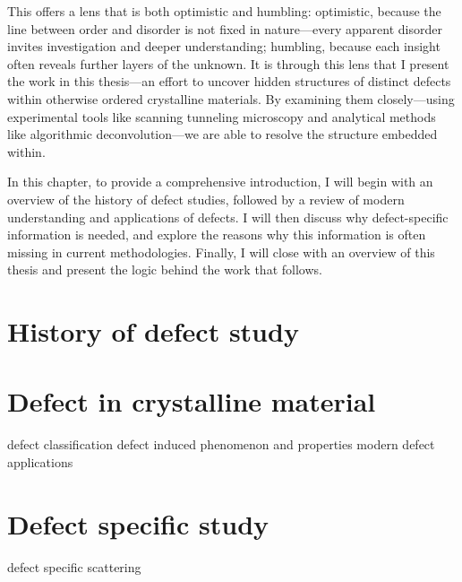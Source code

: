 This offers a lens that is both optimistic and humbling: optimistic, because the line between order and disorder is not fixed in nature—every apparent disorder invites investigation and deeper understanding; humbling, because each insight often reveals further layers of the unknown. It is through this lens that I present the work in this thesis—an effort to uncover hidden structures of distinct defects within otherwise ordered crystalline materials. By examining them closely—using experimental tools like scanning tunneling microscopy and analytical methods like algorithmic deconvolution—we are able to resolve the structure embedded within.

In this chapter, to provide a comprehensive introduction, I will begin with an overview of the history of defect studies, followed by a review of modern understanding and applications of defects. I will then discuss why defect-specific information is needed, and explore the reasons why this information is often missing in current methodologies. Finally, I will close with an overview of this thesis and present the logic behind the work that follows.

\section{History of defect study}
	










\section{Defect in crystalline material}
defect classification
defect induced phenomenon and properties
modern defect applications
\section{Defect specific study}
defect specific scattering 
